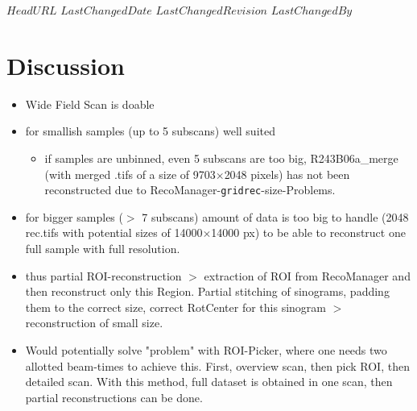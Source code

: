 \svnidlong
{$HeadURL$}
{$LastChangedDate$}
{$LastChangedRevision$}
{$LastChangedBy$}

\begin{center}
\end{center}

\section{Discussion}
\begin{itemize}
	\item Wide Field Scan is doable
	\item for smallish samples (up to 5 subscans) well suited
	\begin{itemize}
		\item if samples are unbinned, even 5 subscans are too big, R243B06a\_merge (with merged .tifs of a size of 9703$\times$2048 pixels) has not been reconstructed due to RecoManager-\verb+gridrec+-size-Problems.
	\end{itemize}
	\item for bigger samples ($>$ 7 subscans) amount of data is too big to handle (2048 rec.tifs with potential sizes of 14000$\times$14000 px) to be able to reconstruct one full sample with full resolution.
	\item thus partial ROI-reconstruction $>$ extraction of ROI from RecoManager and then reconstruct only this Region. Partial stitching of sinograms, padding them to the correct size, correct RotCenter for this sinogram $>$ reconstruction of small size.
	\item Would potentially solve "problem" with ROI-Picker, where one needs two allotted beam-times to achieve this. First, overview scan, then pick ROI, then detailed scan. With this method, full dataset is obtained in one scan, then partial reconstructions can be done.
\end{itemize}